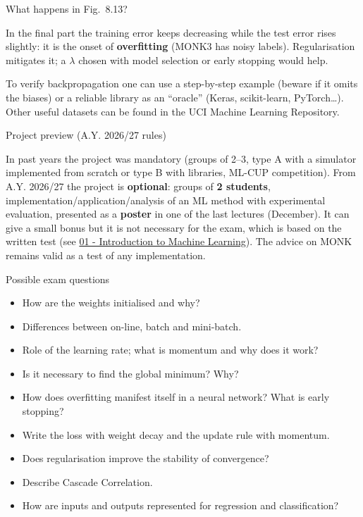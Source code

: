 \begin{boxquestion}{What happens in Fig.\ 8.13?}

In the final part the training error keeps decreasing while the test
error rises slightly: it is the onset of \textbf{overfitting} (MONK3
has noisy labels). Regularisation mitigates it; a \(\lambda\) chosen
with model selection or early stopping would help.

\end{boxquestion}

To verify backpropagation one can use a step-by-step example (beware if
it omits the biases) or a reliable library as an ``oracle'' (Keras,
scikit-learn, PyTorch\ldots). Other useful datasets can be found in the
UCI Machine Learning Repository.

\begin{boxnote}{Project preview (A.Y. 2026/27 rules)}

In past years the project was mandatory (groups of 2--3, type A with a
simulator implemented from scratch or type B with libraries, ML-CUP
competition). From A.Y. 2026/27 the project is \textbf{optional}:
groups of \textbf{2 students}, implementation/application/analysis of
an ML method with experimental evaluation, presented as a
\textbf{poster} in one of the last lectures (December). It can give a
small bonus but it is not necessary for the exam, which is based on the
written test (see
\href{01\%20-\%20Introduzione\%20al\%20Machine\%20Learning}{01 -
Introduction to Machine Learning}). The advice on MONK remains valid as
a test of any implementation.

\end{boxnote}

\begin{boxquestion}{Possible exam questions}

\begin{itemize}
\tightlist
\item
  How are the weights initialised and why?
\item
  Differences between on-line, batch and mini-batch.
\item
  Role of the learning rate; what is momentum and why does it work?
\item
  Is it necessary to find the global minimum? Why?
\item
  How does overfitting manifest itself in a neural network? What is
  early stopping?
\item
  Write the loss with weight decay and the update rule with momentum.
\item
  Does regularisation improve the stability of convergence?
\item
  Describe Cascade Correlation.
\item
  How are inputs and outputs represented for regression and
  classification?
\end{itemize}

\end{boxquestion}
